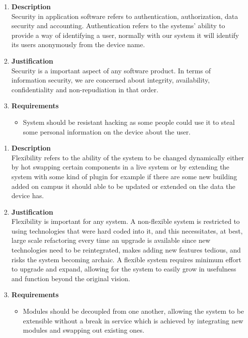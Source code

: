 \documentclass[a4paper,10pt]{article}
\begin{document}
\begin{enumerate}
\item \textbf{Description} \\
Security in application software refers to authentication, authorization, data security and accounting. Authentication refers to the systems' ability to provide a way of identifying a user, normally with our system it will identify its users anonymously from the device name.
\item \textbf{Justification} \\
Security is a important aspect of any software product. In terms of information security, we are concerned about integrity, availability, confidentiality and non-repudiation in that order. 

\item \textbf{Requirements}
	\begin{itemize}
		\item System should be resistant hacking as some people could use it to steal some personal information on the device about the user.
	\end{itemize}
\end{enumerate}
\begin{enumerate}
\item \textbf{Description} \\
Flexibility refers to the ability of the system to be changed dynamically either by hot swapping certain components in a live system or by extending the system with some kind of plugin for example if there are some new building added on campus it should able to be updated or extended on the data the device has. 
\item \textbf{Justification} \\
Flexibility is important for any system. A non-flexible system is restricted to using technologies that were hard coded into it, and this necessitates, at best, large scale refactoring every time an upgrade is available since new technologies need to be reintegrated, makes adding new features tedious, and risks the system becoming archaic. A flexible system requires minimum effort to upgrade and expand, allowing for the system to easily grow in usefulness and function beyond the original vision.
\item \textbf{Requirements}
	\begin{itemize}
	\item Modules should be decoupled from one another, allowing the system to be extensible without a break in service which is achieved by integrating new modules and swapping out existing ones. 
	\end{itemize}
\end{enumerate}
\end{document}

